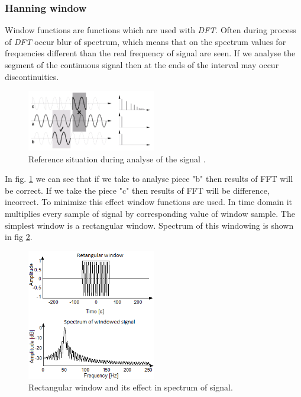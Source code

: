 \documentclass[11pt,titlepage]{article}
\theoremstyle{plain}
\begin{document}
\subsubsection{Hanning window}
Window functions are functions which are used with \textit{DFT}. Often during process of \textit{DFT} occur blur of spectrum, which means that on the spectrum values for frequencies different than the real frequency of signal are seen. If we analyse the segment of the continuous signal then at the ends of the interval may occur discontinuities. 

\begin{figure}[H]
	\centering
	\includegraphics[width=0.5\textwidth]{img/fft_errors}
	\caption{Reference situation during analyse of the signal \cite{hanning}.}
	\label{fig:40}
\end{figure}

In fig. \ref{fig:40} we can see that if we take to analyse piece "b" then results of FFT will be correct. If we take the piece "c" then results of FFT will be difference, incorrect. To minimize this effect window functions are used. In time domain it multiplies every sample of signal by corresponding value of window sample. The simplest window is a rectangular window. Spectrum of this windowing is shown in fig \ref{fig:F9}.
\begin{figure}[H]
	\centering
	\includegraphics[width=0.5\textwidth]{img/rectangular_window}
	\caption{Rectangular window and its effect in spectrum of signal.}
	\label{fig:F9}
\end{figure}
\end{document}
